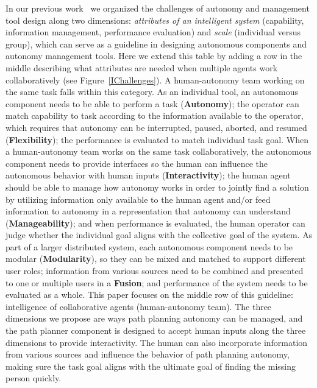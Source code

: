 \documentclass[journal]{IEEEtran}
\begin{document}
In our previous work~\cite{Lin2010Supporting} we organized the challenges of autonomy and management tool design along two dimensions: \textit{attributes of an intelligent system} (capability, information management, performance evaluation) and \textit{scale} (individual versus group), which can serve as a guideline in designing autonomous components and autonomy management tools. Here we extend this table by adding a row in the middle describing what attributes are needed when multiple agents work collaboratively (see Figure~\ref{IChallenges}). A human-autonomy team working on the same task falls within this category. As an individual tool, an autonomous component needs to be able to perform a task (\textbf{Autonomy}); the operator can match capability to task according to the information available to the operator, which requires that autonomy can be interrupted, paused, aborted, and resumed (\textbf{Flexibility}); the performance is evaluated to match individual task goal. When a human-autonomy team works on the same task collaboratively, the autonomous component needs to provide interfaces so the human can influence the autonomous behavior with human inputs (\textbf{Interactivity}); the human agent should be able to manage how autonomy works in order to jointly find a solution by utilizing information only available to the human agent and/or feed information to autonomy in a representation that autonomy can understand (\textbf{Manageability}); and when performance is evaluated, the human operator can judge whether the individual goal aligns with the collective goal of the system. As part of a larger distributed system, each autonomous component needs to be modular (\textbf{Modularity}), so they can be mixed and matched to support different user roles; information from various sources need to be combined and presented to one or multiple users in a \textbf{Fusion}; and performance of the system needs to be evaluated as a whole. This paper focuses on the middle row of this guideline: intelligence of collaborative agents (human-autonomy team). The three dimensions we propose are ways path planning autonomy can be managed, and the path planner component is designed to accept human inputs along the three dimensions to provide interactivity. The human can also incorporate information from various sources and influence the behavior of path planning autonomy, making sure the task goal aligns with the ultimate goal of finding the missing person quickly.
\end{document}
